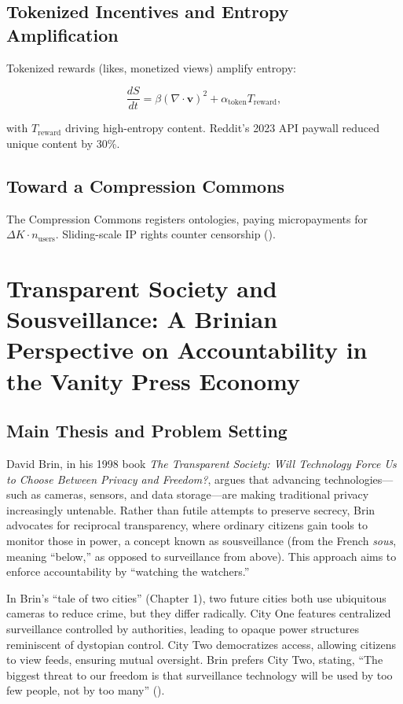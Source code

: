 \documentclass[12pt]{article}
\begin{document}
\subsection{Tokenized Incentives and Entropy Amplification}

Tokenized rewards (likes, monetized views) amplify entropy:

\[
\frac{dS}{dt} = \beta (\nabla \cdot \mathbf{v})^2 + \alpha_{\text{token}} T_{\text{reward}},
\]

with \( T_{\text{reward}} \) driving high-entropy content. Reddit’s 2023 API paywall reduced unique content by 30\%.

\subsection{Toward a Compression Commons}

The Compression Commons registers ontologies, paying micropayments for \(\Delta K \cdot n_{\text{users}}\). Sliding-scale IP rights counter censorship (\citealp{Harberger1965,Wiener1948,Bateson1972}).

\section{Transparent Society and Sousveillance: A Brinian Perspective on Accountability in the Vanity Press Economy}

\subsection{Main Thesis and Problem Setting}

David Brin, in his 1998 book \emph{The Transparent Society: Will Technology Force Us to Choose Between Privacy and Freedom?}, argues that advancing technologies—such as cameras, sensors, and data storage—are making traditional privacy increasingly untenable. Rather than futile attempts to preserve secrecy, Brin advocates for reciprocal transparency, where ordinary citizens gain tools to monitor those in power, a concept known as sousveillance (from the French \emph{sous}, meaning ``below,'' as opposed to surveillance from above). This approach aims to enforce accountability by ``watching the watchers.''

In Brin's ``tale of two cities'' (Chapter 1), two future cities both use ubiquitous cameras to reduce crime, but they differ radically. City One features centralized surveillance controlled by authorities, leading to opaque power structures reminiscent of dystopian control. City Two democratizes access, allowing citizens to view feeds, ensuring mutual oversight. Brin prefers City Two, stating, ``The biggest threat to our freedom is that surveillance technology will be used by too few people, not by too many'' (\citealp{Brin1998}).
\end{document}
